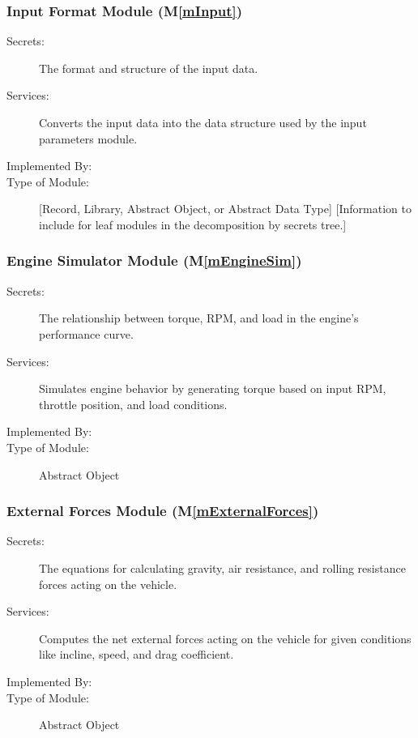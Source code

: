 \documentclass[12pt, titlepage]{article}
\newcommand{\mref}[1]{M\ref{#1}}
\begin{document}
\subsubsection{Input Format Module (\mref{mInput})}

\begin{description}
\item[Secrets:]The format and structure of the input data.
\item[Services:]Converts the input data into the data structure used by the
  input parameters module.
\item[Implemented By:] \progname{}
\item[Type of Module:] [Record, Library, Abstract Object, or Abstract Data Type]
  [Information to include for leaf modules in the decomposition by secrets tree.]
\end{description}

\subsubsection{Engine Simulator Module (\mref{mEngineSim})}

\begin{description}
\item[Secrets:] The relationship between torque, RPM, and load in the engine's performance curve.
\item[Services:] Simulates engine behavior by generating torque based on input RPM, throttle position, and load conditions.
\item[Implemented By:] \progname{}
\item[Type of Module:] Abstract Object
\end{description}

\subsubsection{External Forces Module (\mref{mExternalForces})}

\begin{description}
\item[Secrets:] The equations for calculating gravity, air resistance, and rolling resistance forces acting on the vehicle.
\item[Services:] Computes the net external forces acting on the vehicle for given conditions like incline, speed, and drag coefficient.
\item[Implemented By:] \progname{}
\item[Type of Module:] Abstract Object
\end{description}
\end{document}
